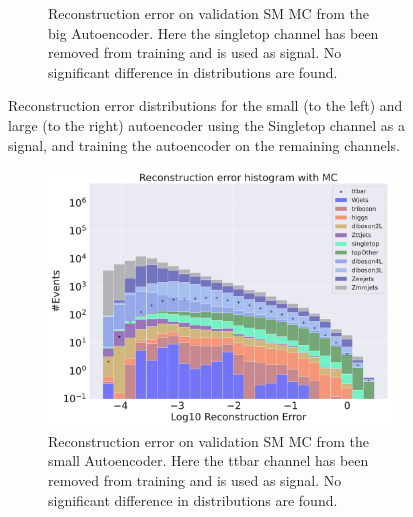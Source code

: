 \begin{figure}[h!]
\begin{subfigure}{.45\textwidth}
        \caption{Reconstruction error on validation SM MC from the big Autoencoder. Here the singletop channel has been removed from training and 
        is used as signal. No significant difference in distributions are found. }
        \label{fig:ae_big_singletop}
    \end{subfigure}
    \hfill
    \caption[AE | Reconstruction error using Singletop channel as signal]{Reconstruction error distributions for the small (to the left) and large (to the right) autoencoder using the Singletop channel as a signal, and 
    training the autoencoder on the remaining channels. } 
    \label{fig:ae_big_channel_2}
\end{figure}

\begin{figure}[h!]
    \centering
    \begin{subfigure}{.45\textwidth}
        \includegraphics[width=\textwidth]{Figures/AE_testing/small/b_data_recon_big_rm3_feats_sig_ttbar.pdf}
        \caption{Reconstruction error on validation SM MC from the small Autoencoder. Here the ttbar channel has been removed from training and 
        is used as signal. No significant difference in distributions are found. }
        \label{fig:ae_small_ttbar}
    \end{subfigure}
    \hfill 
    \begin{subfigure}{.45\textwidth}

\end{subfigure}
\end{figure}
